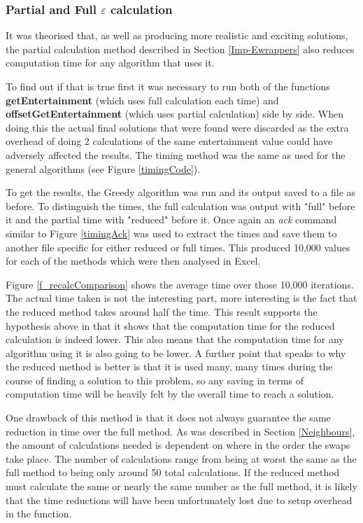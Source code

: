\documentclass[12pt]{report}
\begin{document}
\subsubsection{Partial and Full $\varepsilon$ calculation}
It was theorised that, as well as producing more realistic and exciting solutions, the partial calculation method described in Section \ref{Imp-Ewrappers} also reduces computation time for any algorithm that uses it.

To find out if that is true first it was necessary to run both of the functions \textbf{getEntertainment} (which uses full calculation each time) and \textbf{offsetGetEntertainment} (which uses partial calculation) side by side. When doing this the actual final solutions that were found were discarded as the extra overhead of doing 2 calculations of the same entertainment value could have adversely affected the results. The timing method was the same as used for the general algorithms (see Figure \ref{timingCode}).

To get the results, the Greedy algorithm was run and its output saved to a file as before. To distinguish the times, the full calculation was output with "full" before it and the partial time with "reduced" before it. Once again an \textit{ack} command similar to Figure \ref{timingAck} was used to extract the times and save them to another file specific for either reduced or full times. This produced 10,000 values for each of the methods which were then analysed in Excel.

Figure \ref{f_recalcComparison} shows the average time over those 10,000 iterations. The actual time taken is not the interesting part, more interesting is the fact that the reduced method takes around half the time. This result supports the hypothesis above in that it shows that the computation time for the reduced calculation is indeed lower. This also means that the computation time for any algorithm using it is also going to be lower. A further point that speaks to why the reduced method is better is that it is used many, many times during the course of finding a solution to this problem, so any saving in terms of computation time will be heavily felt by the overall time to reach a solution.

One drawback of this method is that it does not always guarantee the same reduction in time over the full method. As was described in Section \ref{Neighbours}, the amount of calculations needed is dependent on where in the order the swaps take place. The number of calculations range from being at worst the same as the full method to being only around 50 total calculations. If the reduced method must calculate the same or nearly the same number as the full method, it is likely that the time reductions will have been unfortunately lost due to setup overhead in the function.
\end{document}
